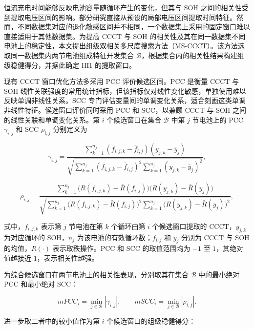 恒流充电时间能够反映电池容量随循环产生的变化，但其与 SOH 之间的相关性受到提取电压区间的影响。部分研究直接从预设的局部电压区间提取时间特征\cite{ref28,ref63}。然而，不同数据集对应的退化敏感区间并不相同，一个数据集上采用的固定窗口难以直接适用于其他数据集。为提高 CCCT 与 SOH 的相关性及其在同一数据集不同电池上的稳定性，本文提出组级双相关多尺度搜索方法（MS-CCCT）。该方法选取同一数据集内两节电池组成特征开发集合 $\mathcal{B}$，根据集合内的相关性结果构建组级稳健得分，并据此确定 HI1 的提取窗口。

现有 CCCT 窗口优化方法多采用 PCC 评价候选区间\cite{ref31,ref51}。PCC 是衡量 CCCT 与 SOH 线性关联强度的常用统计指标，但该指标仅对线性变化敏感，单独使用难以反映单调非线性关系。SCC 专门评估变量间的单调变化关系，适合刻画这类单调非线性特征。候选窗口评价同时采用 PCC 和 SCC，以兼顾 CCCT 与 SOH 之间的线性关联和单调变化关系\cite{ref25,ref53,ref55}。第 $i$ 个候选窗口在集合 $\mathcal{B}$ 中第 $j$ 节电池上的 PCC $\gamma_{i,j}$ 和 SCC $\rho_{i,j}$ 分别定义为

\begin{equation}
\gamma_{i,j}=
\frac{\displaystyle\sum_{k=1}^{n_j}(f_{i,j,k}-\bar{f}_{i,j})(y_{j,k}-\bar{y}_j)}
     {\displaystyle\sqrt{\sum_{k=1}^{n_j}(f_{i,j,k}-\bar{f}_{i,j})^2\sum_{k=1}^{n_j}(y_{j,k}-\bar{y}_j)^2}},
\end{equation}

\begin{equation}
\rho_{i,j}=
\frac{\displaystyle\sum_{k=1}^{n_j}\bigl(R(f_{i,j,k})-\bar{R}(f_{i,j})\bigr)\bigl(R(y_{j,k})-\bar{R}(y_j)\bigr)}
{\displaystyle\sqrt{\sum_{k=1}^{n_j}\bigl(R(f_{i,j,k})-\bar{R}(f_{i,j})\bigr)^2\sum_{k=1}^{n_j}\bigl(R(y_{j,k})-\bar{R}(y_j)\bigr)^2}},
\end{equation}

式中，$f_{i,j,k}$ 表示第 $j$ 节电池在第 $k$ 个循环由第 $i$ 个候选窗口提取的 CCCT，$y_{j,k}$ 为对应循环的 SOH，$n_j$ 为该电池的有效循环数；$\bar{f}_{i,j}$ 和 $\bar{y}_j$ 分别为 CCCT 与 SOH 的均值，$R(\cdot)$ 表示取秩操作。PCC 和 SCC 的取值范围均为 $-1$ 至 $1$，其绝对值越接近 $1$，表示相关性越强。

为综合候选窗口在两节电池上的相关性表现，分别取其在集合 $\mathcal{B}$ 中的最小绝对 PCC 和最小绝对 SCC：

\begin{equation*}
mPCC_i=\min_{j\in\mathcal{B}}|\gamma_{i,j}|,\qquad
mSCC_i=\min_{j\in\mathcal{B}}|\rho_{i,j}|.
\end{equation*}

进一步取二者中的较小值作为第 $i$ 个候选窗口的组级稳健得分：

